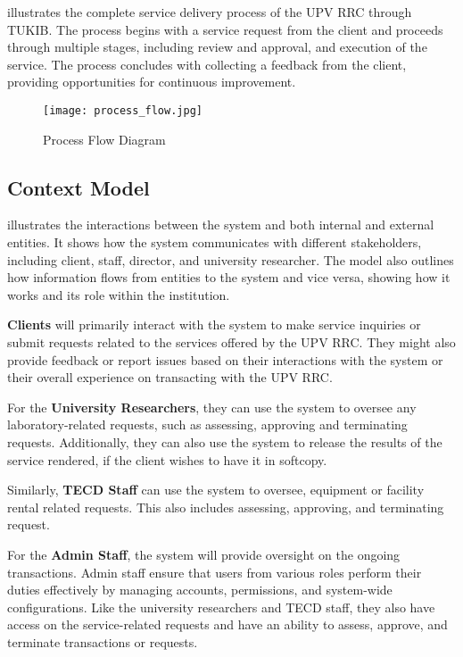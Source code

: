  illustrates the complete service delivery process of the UPV RRC through TUKIB. The process begins with a service request from the client and proceeds through multiple stages, including review and approval, and execution of the service. The process concludes with collecting a feedback from the client, providing opportunities for continuous improvement.

\begin{figure}[h]
	\centering 
	\texttt{[image: process\_flow.jpg]}
	\caption{Process Flow Diagram}
	\label{fig:process_flow}
\end{figure}

\newpage

\subsection{Context Model}

 illustrates the interactions between the system and both internal and external entities. It shows how the system communicates with different stakeholders, including client, staff, director, and university researcher. The model also outlines how information flows from entities to the system and vice versa, showing how it works and its role within the institution.

\textbf{Clients} will primarily interact with the system to make service inquiries or submit requests related to the services offered by the UPV RRC. They might also provide feedback or report issues based on their interactions with the system or their overall experience on transacting with the UPV RRC.

For the \textbf{University Researchers}, they can use the system to oversee any laboratory-related requests, such as assessing, approving and terminating requests. Additionally, they can also use the system to release the results of the service rendered, if the client wishes to have it in softcopy. 

Similarly, \textbf{TECD Staff} can use the system to oversee, equipment or facility rental related requests. This also includes assessing, approving, and terminating request. 

For the \textbf{Admin Staff}, the system will provide oversight on the ongoing transactions. Admin staff ensure that users from various roles perform their duties effectively by managing accounts, permissions, and system-wide configurations. Like the university researchers and TECD staff, they also have access on the service-related requests and have an ability to assess, approve, and terminate transactions or requests.

